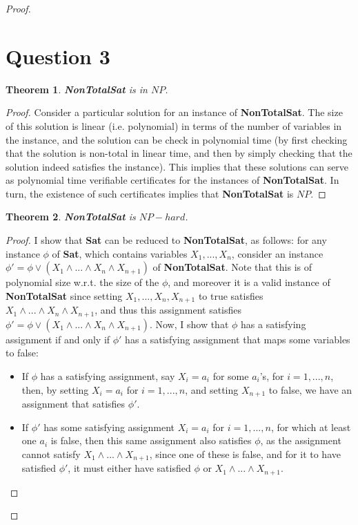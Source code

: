 \documentclass[a4paper,11pt]{scrartcl}
\newtheorem{theorem}{Theorem}
\begin{document}
\begin{proof}
\section*{Question 3}
\begin{theorem}
    \textbf{NonTotalSat} is in $NP$.
\end{theorem}
\begin{proof}
    Consider a particular solution for an instance of \textbf{NonTotalSat}. The size of this solution is linear (i.e. polynomial) in terms of the number of variables in the instance, and the solution can be check in polynomial time (by first checking that the solution is non-total in linear time, and then by simply checking that the solution indeed satisfies the instance). This implies that these solutions can serve as polynomial time verifiable certificates for the instances of \textbf{NonTotalSat}. In turn, the existence of such certificates implies that \textbf{NonTotalSat} is $NP$.
\end{proof}

\begin{theorem}
    \textbf{NonTotalSat} is $NP-hard$.
\end{theorem}
\begin{proof}
    I show that \textbf{Sat} can be reduced to \textbf{NonTotalSat}, as follows: for any instance $\phi$ of \textbf{Sat}, which contains variables $X_1, ..., X_n$, consider an instance $\phi' = \phi \lor (X_1 \land ... \land X_n \land X_{n+1})$ of \textbf{NonTotalSat}. Note that this is of polynomial size w.r.t. the size of the $\phi$, and moreover it is a valid instance of \textbf{NonTotalSat} since setting $X_1, ..., X_n, X_{n+1}$ to true satisfies $X_1 \land ... \land X_n \land X_{n+1}$, and thus this assignment satisfies $\phi' = \phi \lor (X_1 \land ... \land X_n \land X_{n+1})$. Now, I show that $\phi$ has a satisfying assignment if and only if $\phi'$ has a satisfying assignment that maps some variables to false:
    \begin{itemize}
        \item If $\phi$ has a satisfying assignment, say $X_i = a_i$ for some $a_i$'s, for $i = 1, ..., n$, then, by setting $X_i = a_i$ for $i = 1, ..., n$, and setting $X_{n+1}$ to false, we have an assignment that satisfies $\phi'$.
        \item If $\phi'$ has some satisfying assignment $X_i = a_i$ for $i = 1, ..., n$, for which at least one $a_i$ is false, then this same assignment also satisfies $\phi$, as the assignment cannot satisfy $X_1 \land ... \land X_{n+1}$, since one of these is false, and for it to have satisfied $\phi'$, it must either have satisfied $\phi$ or $X_1 \land ... \land X_{n+1}$.
    \end{itemize}
\end{proof}


\end{proof}
\end{document}
